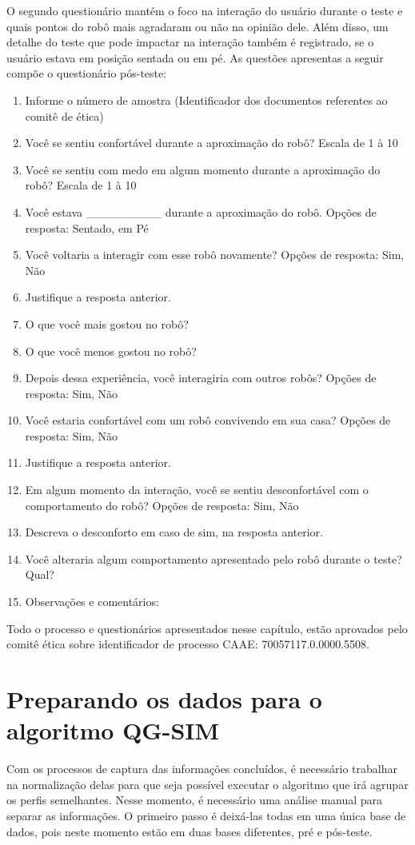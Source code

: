 O segundo questionário mantém o foco na interação do usuário durante o teste e quais pontos do robô mais agradaram ou não na opinião dele. Além disso, um detalhe do teste que pode impactar na interação também é registrado, se o usuário estava em posição sentada ou em pé. As questões apresentas a seguir compõe o questionário pós-teste:

\begin{enumerate}
	\item Informe o número de amostra (Identificador dos documentos referentes ao comitê de ética)
	\item Você se sentiu confortável durante a aproximação do robô? Escala de 1 à 10
	\item Você se sentiu com medo em algum momento durante a aproximação do robô? Escala de 1 à 10
	\item Você estava \_\_\_\_\_\_\_\_\_ durante a aproximação do robô. Opções de resposta: Sentado, em Pé
	\item Você voltaria a interagir com esse robô novamente? Opções de resposta: Sim, Não
	\item Justifique a resposta anterior.
	\item O que você mais gostou no robô?
	\item O que você menos gostou no robô?
	\item Depois dessa experiência, você interagiria com outros robôs? Opções de resposta: Sim, Não
	\item Você estaria confortável com um robô convivendo em sua casa? Opções de resposta: Sim, Não
	\item Justifique a resposta anterior.
	\item Em algum momento da interação, você se sentiu desconfortável com o comportamento do robô? Opções de resposta: Sim, Não
	\item Descreva o desconforto em caso de sim, na resposta anterior.
	\item Você alteraria algum comportamento apresentado pelo robô durante o teste? Qual?
	\item Observações e comentários:
\end{enumerate}

Todo o processo e questionários apresentados nesse capítulo, estão aprovados pelo comitê ética sobre identificador de processo CAAE: 70057117.0.0000.5508.

\section{Preparando os dados para o algoritmo QG-SIM}
\label{sec:preparacao}
Com os processos de captura das informações concluídos, é necessário trabalhar na normalização delas para que seja possível executar o algoritmo que irá agrupar os perfis semelhantes. Nesse momento, é necessário uma análise manual para separar as informações. O primeiro passo é deixá-las todas em uma única base de dados, pois neste momento estão em duas bases diferentes, pré e pós-teste.

